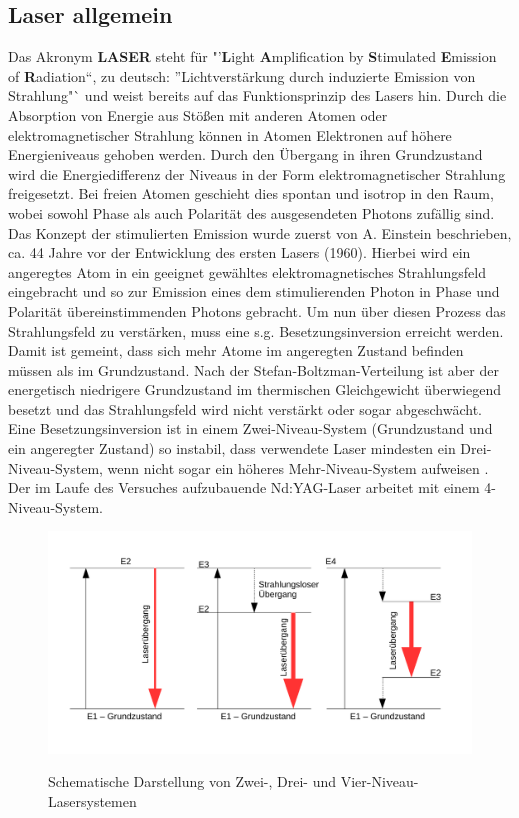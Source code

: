 \documentclass[twoside,colorback,accentcolor=tud4c,11pt]{tudreport}
\begin{document}
\subsection{Laser allgemein}
Das Akronym  \textbf{LASER} steht für "'\textbf{L}ight \textbf{A}mplification by \textbf{S}timulated \textbf{E}mission of \textbf{R}adiation"`, zu deutsch: "'Lichtverstärkung durch induzierte Emission von Strahlung"` und weist bereits auf das Funktionsprinzip des Lasers hin. Durch die Absorption von Energie aus Stößen mit anderen Atomen oder elektromagnetischer Strahlung können in Atomen Elektronen auf höhere Energieniveaus gehoben werden. Durch den Übergang in ihren Grundzustand wird die Energiedifferenz der Niveaus in der Form elektromagnetischer Strahlung freigesetzt. Bei freien Atomen geschieht dies spontan und isotrop in den Raum, wobei sowohl Phase als auch Polarität des ausgesendeten Photons zufällig sind.\\
Das Konzept der stimulierten Emission wurde zuerst von A. Einstein beschrieben, ca. 44 Jahre vor der Entwicklung des ersten Lasers (1960). Hierbei wird ein angeregtes Atom in ein geeignet gewähltes elektromagnetisches Strahlungsfeld eingebracht und so zur Emission eines dem stimulierenden Photon in Phase und Polarität übereinstimmenden Photons gebracht. Um nun über diesen Prozess das Strahlungsfeld zu verstärken, muss eine s.g. Besetzungsinversion erreicht werden. Damit ist gemeint, dass sich mehr Atome im angeregten Zustand befinden müssen als im Grundzustand. Nach der Stefan-Boltzman-Verteilung ist aber der energetisch niedrigere Grundzustand im thermischen Gleichgewicht überwiegend besetzt und das Strahlungsfeld wird nicht verstärkt oder sogar abgeschwächt. Eine Besetzungsinversion ist in einem Zwei-Niveau-System (Grundzustand und ein angeregter Zustand) so instabil, dass verwendete Laser mindesten ein Drei-Niveau-System, wenn nicht sogar ein höheres Mehr-Niveau-System aufweisen \cite{prot1}.\\
Der im Laufe des Versuches aufzubauende Nd:YAG-Laser arbeitet mit einem 4-Niveau-System.
\begin{figure}[H]
\centering
   	\begin{minipage}[b]{0.8\textwidth}
   	\includegraphics[width=\textwidth]{graphics/Lasersys.pdf}
  	\label{lasys}
   	\end{minipage}
\caption{Schematische Darstellung von Zwei-, Drei- und Vier-Niveau-Lasersystemen} 	
\end{figure}
\end{document}

